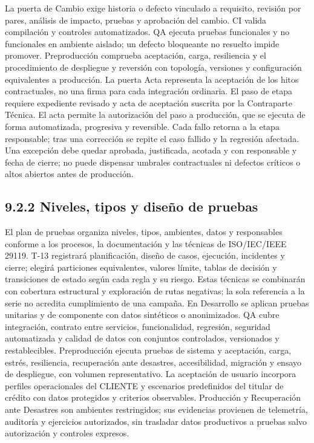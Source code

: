 \documentclass[11pt]{article}
\begin{document}
La puerta de Cambio exige historia o defecto vinculado a requisito, revisión por pares, análisis de impacto, pruebas y aprobación del cambio. CI valida compilación y controles automatizados. QA ejecuta pruebas funcionales y no funcionales en ambiente aislado; un defecto bloqueante no resuelto impide promover. Preproducción comprueba aceptación, carga, resiliencia y el procedimiento de despliegue y reversión con topología, versiones y configuración equivalentes a producción. La puerta Acta representa la aceptación de los hitos contractuales, no una firma para cada integración ordinaria. El paso de etapa requiere expediente revisado y acta de aceptación suscrita por la Contraparte Técnica. El acta permite la autorización del paso a producción, que se ejecuta de forma automatizada, progresiva y reversible. Cada fallo retorna a la etapa responsable; tras una corrección se repite el caso fallido y la regresión afectada. Una excepción debe quedar aprobada, justificada, acotada y con responsable y fecha de cierre; no puede dispensar umbrales contractuales ni defectos críticos o altos abiertos antes de producción.

\subsection{9.2.2 Niveles, tipos y diseño de pruebas}

El plan de pruebas organiza niveles, tipos, ambientes, datos y responsables conforme a los procesos, la documentación y las técnicas de ISO/IEC/IEEE 29119. T-13 registrará planificación, diseño de casos, ejecución, incidentes y cierre; elegirá particiones equivalentes, valores límite, tablas de decisión y transiciones de estado según cada regla y su riesgo. Estas técnicas se combinarán con cobertura estructural y exploración de rutas negativas; la sola referencia a la serie no acredita cumplimiento de una campaña. En Desarrollo se aplican pruebas unitarias y de componente con datos sintéticos o anonimizados. QA cubre integración, contrato entre servicios, funcionalidad, regresión, seguridad automatizada y calidad de datos con conjuntos controlados, versionados y restablecibles. Preproducción ejecuta pruebas de sistema y aceptación, carga, estrés, resiliencia, recuperación ante desastres, accesibilidad, migración y ensayo de despliegue, con volumen representativo. La aceptación de usuario incorpora perfiles operacionales del CLIENTE y escenarios predefinidos del titular de crédito con datos protegidos y criterios observables. Producción y Recuperación ante Desastres son ambientes restringidos; sus evidencias provienen de telemetría, auditoría y ejercicios autorizados, sin trasladar datos productivos a pruebas salvo autorización y controles expresos.
\end{document}
